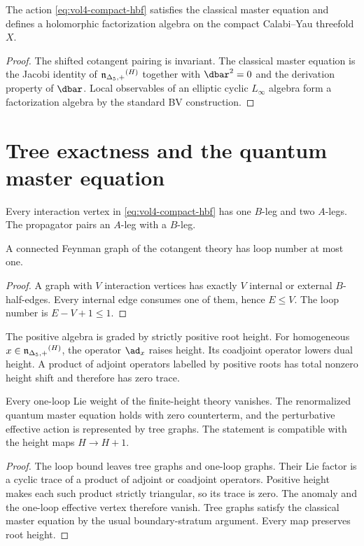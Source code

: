 \begin{theorem}
The action \eqref{eq:vol4-compact-hbf} satisfies the classical master equation and defines a holomorphic factorization algebra on the compact Calabi--Yau threefold $X$.
\end{theorem}
\begin{proof}
The shifted cotangent pairing is invariant.  The classical master equation is the Jacobi identity of ${\mathfrak n_{\Delta_5,+}}^{(H)}$ together with $\dbar^2=0$ and the derivation property of $\dbar$.  Local observables of an elliptic cyclic $L_\infty$ algebra form a factorization algebra by the standard BV construction.
\end{proof}

\chapter{Tree exactness and the quantum master equation}
Every interaction vertex in \eqref{eq:vol4-compact-hbf} has one $B$-leg and two $A$-legs.  The propagator pairs an $A$-leg with a $B$-leg.

\begin{lemma}
A connected Feynman graph of the cotangent theory has loop number at most one.
\end{lemma}
\begin{proof}
A graph with $V$ interaction vertices has exactly $V$ internal or external $B$-half-edges.  Every internal edge consumes one of them, hence $E\le V$.  The loop number is $E-V+1\le1$.
\end{proof}

The positive algebra is graded by strictly positive root height.  For homogeneous $x\in{\mathfrak n_{\Delta_5,+}}^{(H)}$, the operator $\ad_x$ raises height.  Its coadjoint operator lowers dual height.  A product of adjoint operators labelled by positive roots has total nonzero height shift and therefore has zero trace.

\begin{theorem}
Every one-loop Lie weight of the finite-height theory vanishes.  The renormalized quantum master equation holds with zero counterterm, and the perturbative effective action is represented by tree graphs.  The statement is compatible with the height maps $H\to H+1$.
\end{theorem}
\begin{proof}
The loop bound leaves tree graphs and one-loop graphs.  Their Lie factor is a cyclic trace of a product of adjoint or coadjoint operators.  Positive height makes each such product strictly triangular, so its trace is zero.  The anomaly and the one-loop effective vertex therefore vanish.  Tree graphs satisfy the classical master equation by the usual boundary-stratum argument.  Every map preserves root height.
\end{proof}

